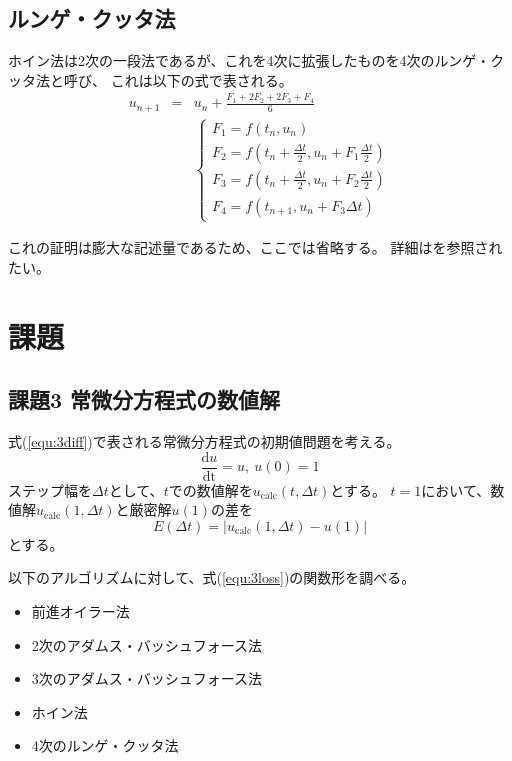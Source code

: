 \documentclass[a4j, titlepage]{jsarticle}
\numberwithin{equation}{section}
\begin{document}
    \subsection{ルンゲ・クッタ法}
        ホイン法は2次の一段法であるが、これを4次に拡張したものを4次のルンゲ・クッタ法と呼び、
        これは以下の式で表される。
        \begin{eqnarray}
            u_{n+1} &=& u_n + \frac{F_1 + 2F_2 + 2F_3 + F_4}{6} \\
            &&\begin{cases}
                F_1 = f(t_n, u_n) \\
                F_2 = \displaystyle f(t_n + \frac{\Delta t}{2}, u_n + F_1\frac{\Delta t}{2}) \\
                F_3 = \displaystyle f(t_n + \frac{\Delta t}{2}, u_n + F_2\frac{\Delta t}{2}) \\
                F_4 = f(t_{n+1}, u_n + F_3\Delta t)
            \end{cases}
        \end{eqnarray}

        これの証明は膨大な記述量であるため、ここでは省略する。
        詳細は\cite{runge}を参照されたい。

\section{課題}
    \subsection{課題3 常微分方程式の数値解}
        式(\ref{equ:3diff})で表される常微分方程式の初期値問題を考える。
        \begin{equation}
            \frac{\mathrm{d}u}{\mathrm{dt}}=u, \ u(0)=1 \label{equ:3diff}
        \end{equation}
        ステップ幅を$\Delta t$として、$t$での数値解を$u_\mathrm{calc}(t, \Delta t)$とする。
        $t=1$において、数値解$u_\mathrm{calc}(1, \Delta t)$と厳密解$u(1)$の差を
        \begin{equation}
            E(\Delta t) = |u_\mathrm{calc}(1, \Delta t) - u(1)| \label{equ:3loss}
        \end{equation}
        とする。

        以下のアルゴリズムに対して、式(\ref{equ:3loss})の関数形を調べる。
        \begin{itemize}
            \item 前進オイラー法
            \item 2次のアダムス・バッシュフォース法
            \item 3次のアダムス・バッシュフォース法
            \item ホイン法
            \item 4次のルンゲ・クッタ法
        \end{itemize}
\end{document}
